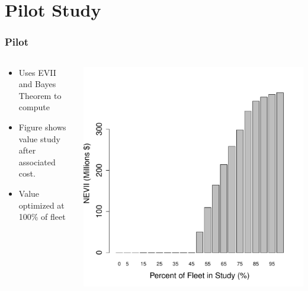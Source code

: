 \documentclass{beamer}
\begin{document}
\section{Pilot Study}
\begin{frame}
  \frametitle{Pilot}
  \begin{columns}
    \begin{column}{0.4\textwidth}
      \begin{itemize}
      \item Uses EVII and Bayes Theorem to compute
      \item Figure shows value study after associated cost.
      \item Value optimized at 100\% of fleet
      \end{itemize}
    \end{column}
    \begin{column}{0.6\textwidth}
      \centering
      \includegraphics[width=\textwidth]{../../R/alt3barplot}
    \end{column}
  \end{columns}
\end{frame}
\end{document}
